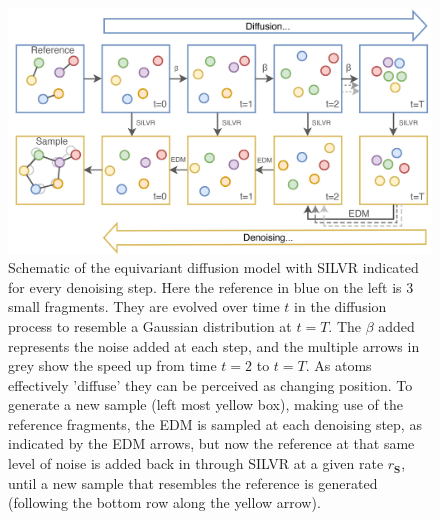 \documentclass[journal=jacsat,manuscript=article]{achemso}
\begin{document}
\begin{figure}
    \centering
    \includegraphics[width=\textwidth]{paper/Figures/Fig1/Schematic.png}
    \caption{Schematic of the equivariant diffusion model with  SILVR indicated for every denoising step. Here the reference in blue on the left is 3 small fragments. They are evolved over time $t$ in the diffusion process to resemble a Gaussian distribution at $t=T$. The $\beta$ added represents the noise added at each step, and the multiple arrows in grey show the speed up from time $t=2$ to $t=T$. As atoms effectively 'diffuse' they can be perceived as changing position. To generate a new sample (left most yellow box), making use of the reference fragments, the EDM is sampled at each denoising step, as indicated by the EDM arrows, but now the reference at that same level of noise is added back in through SILVR at a given rate $r_{\mathbf{S}}$, until a new sample that resembles the reference is generated (following the bottom row along the yellow arrow).}
    \label{fig:schematic}
\end{figure}
\end{document}

